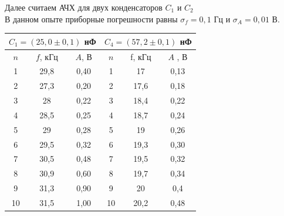 \documentclass[a4paper, 12pt]{article}%
\begin{document}
\newpage
Далее считаем АЧХ для двух конденсаторов $C_1$ и $C_2$\\
В данном опыте приборные погрешности равны $\sigma_f = 0,1$ Гц и $\sigma_A = 0,01$ В.
\begin{center}
\begin{tabular}{ccc|c|c|c|}
\hline
\multicolumn{3}{|c|}{$C_1 = (25,0\pm 0,1)$ нФ}                                                                                                         & \multicolumn{3}{c|}{$C_4 = (57,2 \pm 0,1)$ нФ}        \\ \hline
\multicolumn{1}{|c|}{$n$} & \multicolumn{1}{c|}{$f$, кГц}  & \multicolumn{1}{c|}{$A$, В}   & $n$ & f, кГц & $A$ , В  \\ \hline
\multicolumn{1}{|c|}{1}   & \multicolumn{1}{c|}{29,8}  & \multicolumn{1}{c|}{0,40}                  & 1   & 17     & 0,13          \\ \hline
\multicolumn{1}{|c|}{2}   & \multicolumn{1}{c|}{27,3}                & \multicolumn{1}{c|}{0,20}                    & 2   & 17,6    & 0,18  \\ \hline
\multicolumn{1}{|c|}{3}   & \multicolumn{1}{c|}{28}                   & \multicolumn{1}{c|}{0,22}                    & 3   & 18,4                & 0,22         \\ \hline
\multicolumn{1}{|c|}{4}   & \multicolumn{1}{c|}{28,5}            & \multicolumn{1}{c|}{0,25}                   & 4   & 18,7             & 0,24          \\ \hline
\multicolumn{1}{|c|}{5}   & \multicolumn{1}{c|}{29}             & \multicolumn{1}{c|}{0,28}                   & 5   & 19                 & 0,26          \\ \hline
\multicolumn{1}{|c|}{6}   & \multicolumn{1}{c|}{29,5}          & \multicolumn{1}{c|}{0,32}                   & 6   & 19,3             & 0,30    \\ \hline
\multicolumn{1}{|c|}{7}   & \multicolumn{1}{c|}{30,5}          & \multicolumn{1}{c|}{0,48}                   & 7   & 19,5            & 0,32      \\ \hline
\multicolumn{1}{|c|}{8}   & \multicolumn{1}{c|}{30,9}              & \multicolumn{1}{c|}{0,60}                  & 8   & 19,7               & 0,34 \\ \hline
\multicolumn{1}{|c|}{9}   & \multicolumn{1}{c|}{31,3}        & \multicolumn{1}{c|}{0,90}                 & 9   & 20                 & 0,4  \\ \hline
\multicolumn{1}{|c|}{10}  & \multicolumn{1}{c|}{31,5}  & \multicolumn{1}{c|}{1,00}                 & 10  & 20,2             & 0,48          \\ \hline

\end{tabular}
\end{center}
\end{document}

